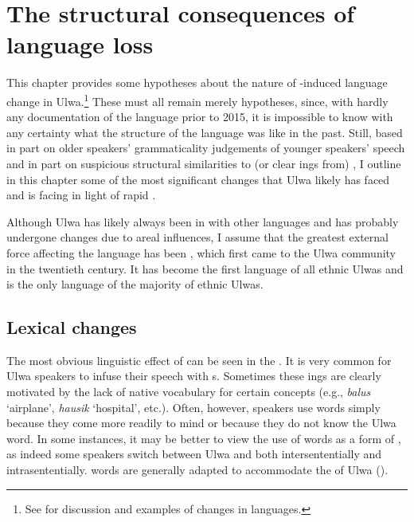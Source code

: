 \chapter{The structural consequences of language loss}\label{sec:15}


This chapter provides some hypotheses about the nature of -induced language change in Ulwa.\footnote{See \citet{CampbellMuntzel1989} for discussion and examples of changes in  languages.} These must all remain merely hypotheses, since, with hardly any documentation of the language prior to 2015, it is impossible to know with any certainty what the structure of the language was like in the past. Still, based in part on older speakers’ grammaticality judgements of younger speakers’ speech and in part on suspicious structural similarities to (or clear ings from) , I outline in this chapter some of the most significant changes that Ulwa likely has faced and is facing in light of rapid .

  Although Ulwa has likely always been in  with other languages and has probably undergone changes due to areal influences, I assume that the greatest external force affecting the language has been , which first came to the Ulwa community in the twentieth century. It has become the first language of all ethnic Ulwas and is the only language of the majority of ethnic Ulwas.


\section{Lexical changes}\label{sec:15.1}



The most obvious linguistic effect of  can be seen in the . It is very common for Ulwa speakers to infuse their speech with  s. Sometimes these ings are clearly motivated by the lack of native vocabulary for certain concepts (e.g.,  \textit{balus} ‘airplane’, \textit{hausik} ‘hospital’, etc.). Often, however, speakers use  words simply because they come more readily to mind or because they do not know the Ulwa word. In some instances, it may be better to view the use of  words as a form of , as indeed some speakers switch between Ulwa and  both intersententially and intrasententially.  words are generally adapted to accommodate the  of Ulwa ().

